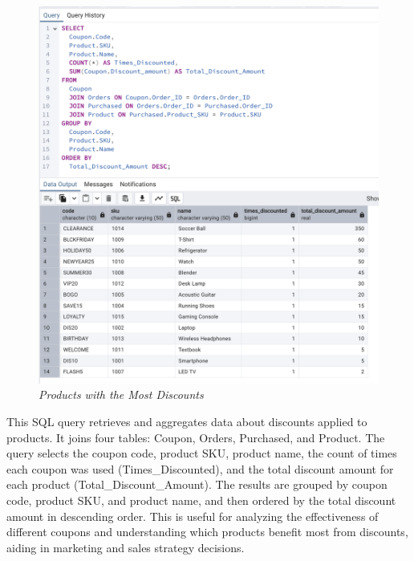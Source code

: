 


\begin{figure}[H]
  \centering
  \includegraphics[width=1\textwidth]{images/sql/complex-queries/products_with_the_most_discounts.png}
  \caption{\textit{Products with the Most Discounts}}
\end{figure}

This SQL query retrieves and aggregates data about discounts applied to products. It joins four tables: Coupon, Orders, Purchased, and Product. The query selects the coupon code, product SKU, product name, the count of times each coupon was used (Times\_Discounted), and the total discount amount for each product (Total\_Discount\_Amount). The results are grouped by coupon code, product SKU, and product name, and then ordered by the total discount amount in descending order. This is useful for analyzing the effectiveness of different coupons and understanding which products benefit most from discounts, aiding in marketing and sales strategy decisions.

